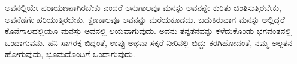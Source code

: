 ಅವನಲ್ಲಿಯೇ ಪರಾಯಣನಾಗಿರಬೇಕು ಎಂದರೆ ಅನುಗಾಲವೂ ಮನಸ್ಸು ಅವನನ್ನೇ ಕುರಿತು ಚಿಂತಿಸುತ್ತಿರಬೇಕು, ಅವನೆಡೆಗೇ ಹರಿಯುತ್ತಿರಬೇಕು. ಕ್ಷಣಕಾಲವೂ ಅವನನ್ನು ಮರೆಯಕೂಡದು. ಬದುಕಿರುವಾಗ ಮನಸ್ಸು ಅಲ್ಲಿದ್ದರೆ ಕೊನೆಗಾಲದಲ್ಲಿಯೂ ಮನಸ್ಸು ಅವನಲ್ಲಿ ಲಯವಾಗುವುದು. ಅವನು ತನ್ನತನವನ್ನು ಕಳೆದುಕೊಂಡು ಭಗವಂತನಲ್ಲಿ ಒಂದಾಗುವನು. ಹನಿ ಸಾಗರಕ್ಕೆ ಬಿದ್ದಂತೆ, ಉಪ್ಪು ಅಥವಾ ಸಕ್ಕರೆ ನೀರಿನಲ್ಲಿ ಬಿದ್ದು ಕರಗಿಹೋದಂತೆ, ನಮ್ಮ ಅಲ್ಪತನ ಹೋಗುವುದು, ಭೂಮದೊಂದಿಗೆ ಒಂದಾಗುವುದು.

